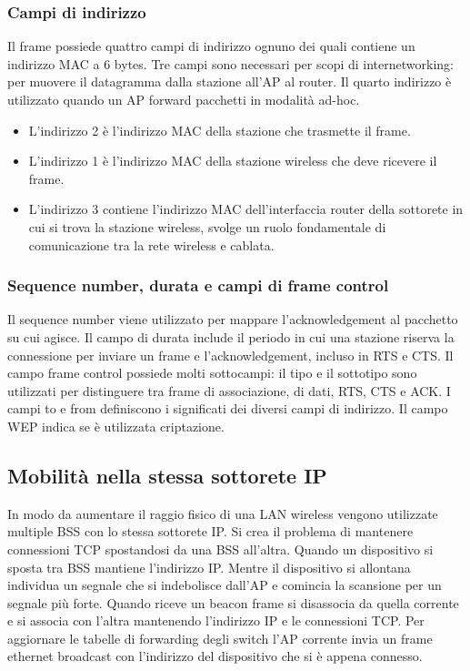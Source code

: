 \subsubsection{Campi di indirizzo}
Il frame possiede quattro campi di indirizzo ognuno dei quali contiene un indirizzo MAC a 6 bytes. Tre campi sono necessari per scopi di internetworking: per muovere il datagramma dalla stazione all'AP al
router. Il quarto indirizzo \`e utilizzato quando un AP forward pacchetti in modalit\`a ad-hoc. 
\begin{itemize}
\item L'indirizzo 2 \`e l'indirizzo MAC della stazione che trasmette il frame. 
\item L'indirizzo 1 \`e l'indirizzo MAC della stazione wireless che deve ricevere il frame. 
\item L'indirizzo 3 contiene l'indirizzo MAC dell'interfaccia router della sottorete in cui si trova la stazione wireless, svolge un ruolo fondamentale di comunicazione tra la rete wireless e cablata.
\end{itemize}
\subsubsection{Sequence number, durata  e campi di frame control}
Il sequence number viene utilizzato per mappare l'acknowledgement al pacchetto su cui agisce. Il campo di durata include il periodo in cui una stazione riserva la connessione per inviare un frame e 
l'acknowledgement, incluso in RTS e CTS. Il campo frame control possiede molti sottocampi: il tipo e il sottotipo sono utilizzati per distinguere tra frame di associazione, di dati, RTS, CTS e ACK. I campi to e 
from definiscono i significati dei diversi campi di indirizzo. Il campo WEP indica se \`e utilizzata criptazione.
\subsection{Mobilit\`a nella stessa sottorete IP}
In modo da aumentare il raggio fisico di una LAN wireless vengono utilizzate multiple BSS con lo stessa sottorete IP. Si crea il problema di mantenere connessioni TCP spostandosi da una BSS all'altra. Quando
un dispositivo si sposta tra BSS mantiene l'indirizzo IP. Mentre il dispositivo si allontana individua un segnale che si indebolisce dall'AP e comincia la scansione per un segnale pi\`u forte. Quando riceve un 
beacon frame si disassocia da quella corrente e si associa con l'altra mantenendo l'indirizzo IP e le connessioni TCP. Per aggiornare le tabelle di forwarding degli switch l'AP corrente invia un frame ethernet 
broadcast con l'indirizzo del dispositivo che si \`e appena connesso. 